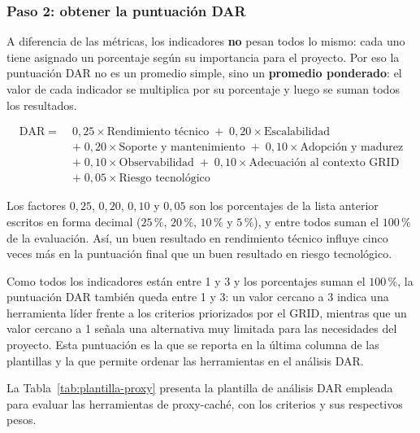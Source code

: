 \subsubsection{Paso 2: obtener la puntuación DAR}

A diferencia de las métricas, los indicadores \textbf{no} pesan todos lo
mismo: cada uno tiene asignado un porcentaje según su importancia para el
proyecto. Por eso la puntuación DAR no es un promedio simple, sino un
\textbf{promedio ponderado}: el valor de cada indicador se multiplica por
su porcentaje y luego se suman todos los resultados.

\begin{align*}
  \text{DAR} \;=\;\; & 0{,}25 \times \text{Rendimiento técnico}
                 \;+\; 0{,}20 \times \text{Escalabilidad} \\[0.2em]
       &+\; 0{,}20 \times \text{Soporte y mantenimiento}
        \;+\; 0{,}10 \times \text{Adopción y madurez} \\[0.2em]
       &+\; 0{,}10 \times \text{Observabilidad}
        \;+\; 0{,}10 \times \text{Adecuación al contexto GRID} \\[0.2em]
       &+\; 0{,}05 \times \text{Riesgo tecnológico}
\end{align*}

Los factores $0{,}25$, $0{,}20$, $0{,}10$ y $0{,}05$ son los porcentajes
de la lista anterior escritos en forma decimal ($25\,\%$, $20\,\%$,
$10\,\%$ y $5\,\%$), y entre todos suman el $100\,\%$ de la evaluación.
Así, un buen resultado en rendimiento técnico influye cinco veces más en
la puntuación final que un buen resultado en riesgo tecnológico.

Como todos los indicadores están entre 1 y 3 y los porcentajes suman el
$100\,\%$, la puntuación DAR también queda entre 1 y 3: un valor cercano
a 3 indica una herramienta líder frente a los criterios priorizados por
el GRID, mientras que un valor cercano a 1 señala una alternativa muy
limitada para las necesidades del proyecto. Esta puntuación es la que se
reporta en la última columna de las plantillas y la que permite ordenar
las herramientas en el análisis DAR.

La Tabla~\ref{tab:plantilla-proxy} presenta la plantilla de análisis DAR empleada para evaluar
las herramientas de proxy-caché, con los criterios y sus respectivos
pesos.

